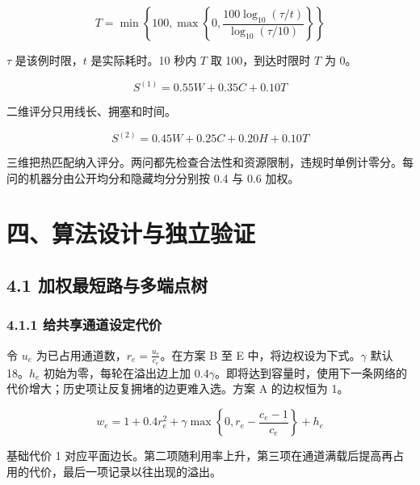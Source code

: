 \documentclass[12pt,a4paper]{article}
\begin{document}
\begin{equation}
T=\min\left\{100,\max\left\{0,\frac{100\log_{10}(\tau/t)}{\log_{10}(\tau/10)}\right\}\right\}
\label{eq:time}
\end{equation}

\(\tau\) 是该例时限，\(t\) 是实际耗时。10 秒内 \(T\) 取 100，到达时限时 \(T\) 为 0。

\begin{equation}
S^{(1)}=0.55W+0.35C+0.10T
\label{eq:score1}
\end{equation}

二维评分只用线长、拥塞和时间。

\begin{equation}
S^{(2)}=0.45W+0.25C+0.20H+0.10T
\label{eq:score2}
\end{equation}

三维把热匹配纳入评分。两问都先检查合法性和资源限制，违规时单例计零分。每问的机器分由公开均分和隐藏均分分别按
0.4 与 0.6 加权。

\section{四、算法设计与独立验证}\label{ux56dbux7b97ux6cd5ux8bbeux8ba1ux4e0eux72ecux7acbux9a8cux8bc1}

\subsection{4.1
加权最短路与多端点树}\label{ux52a0ux6743ux6700ux77edux8defux4e0eux591aux7aefux70b9ux6811}

\subsubsection{4.1.1
给共享通道设定代价}\label{ux7ed9ux5171ux4eabux901aux9053ux8bbeux5b9aux4ee3ux4ef7}

令 \(u_e\) 为已占用通道数，\(r_e=\frac{u_e}{c_e}\)。在方案 B 至 E 中，将边权设为下式。\(\gamma\) 默认
18。\(h_e\) 初始为零，每轮在溢出边上加
\(0.4\gamma\)。即将达到容量时，使用下一条网络的代价增大；历史项让反复拥堵的边更难入选。方案
A 的边权恒为 1。

\begin{equation}
w_e=1+0.4r_e^2+\gamma\max\left\{0,r_e-\frac{c_e-1}{c_e}\right\}+h_e
\label{eq:weight}
\end{equation}

基础代价 1
对应平面边长。第二项随利用率上升，第三项在通道满载后提高再占用的代价，最后一项记录以往出现的溢出。
\end{document}
